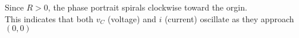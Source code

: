 \documentclass[preview]{standalone}
\begin{document}
\begin{center}
Since $R > 0$, the phase portrait spirals clockwise toward the orgin. \\
                This indicates that both $v_C$ (voltage) and $i$ (current) oscillate as they approach $(0,0)$
\end{center}
\end{document}
